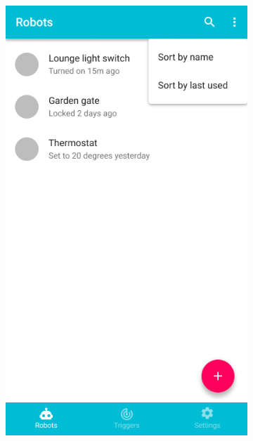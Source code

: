 \documentclass[onecolumn]{IEEEtran}
\begin{document}
\begin{figure}
\begin{subfigure}{.33\textwidth}
        \includegraphics[width=.9\linewidth]{app-2.png}
    \end{subfigure}
    \begin{subfigure}{.33\textwidth}
        \centering

\end{subfigure}
\end{figure}
\end{document}
